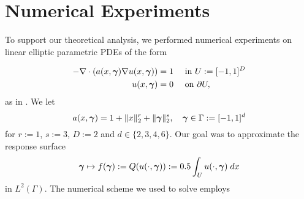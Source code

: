 \section{Numerical Experiments}
\label{sec:numerics}
To support our theoretical analysis, we performed numerical experiments on linear elliptic parametric PDEs of the form

\begin{equation}
\label{eq:pdenum}
\begin{aligned}
-\nabla \cdot (a(x,\bm{\gamma}) \nabla u(x,\bm{\gamma}))&=1&&\text{ in }U:=[-1,1]^D\\
u(x,\bm{\gamma})&=0&&\text{ on } \partial U,
\end{aligned}
\end{equation}
as in .
We let
\begin{equation*}
a(x,\bm{\gamma})={1 + \|x\|_2^{r} + \|\bm{\gamma}\|_2^{s}},\quad \bm{\gamma}\in\Gamma:=[-1,1]^d
\end{equation*}
for $r := 1$, $s := 3$, $D:=2$ and $d\in\{2,3,4,6\}$.
Our goal was to approximate the response surface
\begin{equation*}
\bm{\gamma}\mapsto f(\bm{\gamma}):=Q(u(\cdot,\bm{\gamma})):=0.5 \int_{U}u(\cdot,\bm{\gamma})\;dx
\end{equation*}
in $L^2(\Gamma)$.
%
%
The numerical scheme we used to solve  employs
